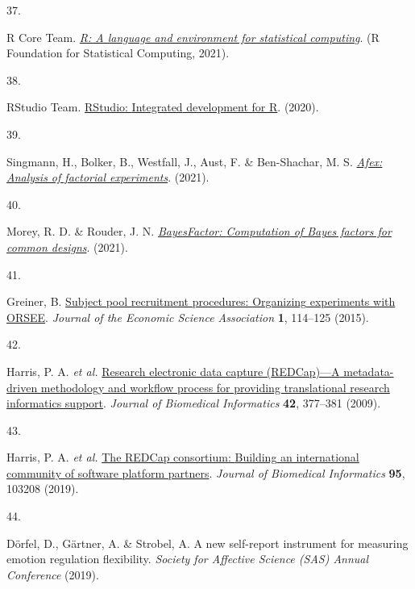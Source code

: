 \documentclass[
  man,floatsintext]{apa6}
\newlength{\cslhangindent}
\newlength{\csllabelwidth}
\newlength{\cslentryspacingunit} %
\newenvironment{CSLReferences}[2] %
 {%
  \setlength{\parindent}{0pt}
  \ifodd #1
  \let\oldpar\par
  \def\par{\hangindent=\cslhangindent\oldpar}
  \fi
  \setlength{\parskip}{#2\cslentryspacingunit}
 }%
 {}
\newcommand{\CSLLeftMargin}[1]{\parbox[t]{\csllabelwidth}{#1}}
\newcommand{\CSLRightInline}[1]{\parbox[t]{\linewidth - \csllabelwidth}{#1}\break}
\begin{document}
\begin{CSLReferences}{0}{0}
\leavevmode{}%
\CSLLeftMargin{37. }%
\CSLRightInline{R Core Team. \emph{\href{https://www.R-project.org/}{R: A language and environment for statistical computing}}. (R Foundation for Statistical Computing, 2021).}

\leavevmode{}%
\CSLLeftMargin{38. }%
\CSLRightInline{RStudio Team. \href{http://www.rstudio.com}{{RStudio}: {Integrated} development for {R}}. (2020).}

\leavevmode{}%
\CSLLeftMargin{39. }%
\CSLRightInline{Singmann, H., Bolker, B., Westfall, J., Aust, F. \& Ben-Shachar, M. S. \emph{\href{https://CRAN.R-project.org/package=afex}{Afex: {A}nalysis of factorial experiments}}. (2021).}

\leavevmode{}%
\CSLLeftMargin{40. }%
\CSLRightInline{Morey, R. D. \& Rouder, J. N. \emph{\href{https://CRAN.R-project.org/package=BayesFactor}{{BayesFactor}: {Computation} of {Bayes} factors for common designs}}. (2021).}

\leavevmode{}%
\CSLLeftMargin{41. }%
\CSLRightInline{Greiner, B. \href{https://doi.org/10.1007/s40881-015-0004-4}{Subject pool recruitment procedures: {Organizing} experiments with {ORSEE}}. \emph{Journal of the Economic Science Association} \textbf{1}, 114--125 (2015).}

\leavevmode{}%
\CSLLeftMargin{42. }%
\CSLRightInline{Harris, P. A. \emph{et al.} \href{https://doi.org/10.1016/j.jbi.2008.08.010}{Research electronic data capture ({REDCap})---{A} metadata-driven methodology and workflow process for providing translational research informatics support}. \emph{Journal of Biomedical Informatics} \textbf{42}, 377--381 (2009).}

\leavevmode{}%
\CSLLeftMargin{43. }%
\CSLRightInline{Harris, P. A. \emph{et al.} \href{https://doi.org/10.1016/j.jbi.2019.103208}{The {REDCap} consortium: {Building} an international community of software platform partners}. \emph{Journal of Biomedical Informatics} \textbf{95}, 103208 (2019).}

\leavevmode{}%
\CSLLeftMargin{44. }%
\CSLRightInline{Dörfel, D., Gärtner, A. \& Strobel, A. A new self-report instrument for measuring emotion regulation flexibility. \emph{Society for Affective Science (SAS) Annual Conference} (2019).}


\end{CSLReferences}
\end{document}

